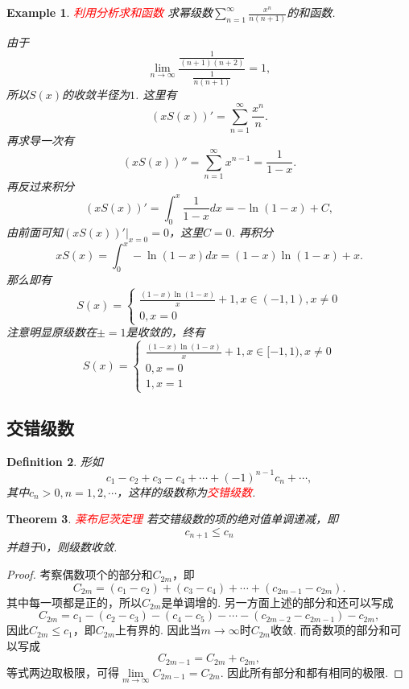 \documentclass{article}
\newtheorem{theorem}{Theorem}[section]
\newtheorem{example}[theorem]{Example}
\newtheorem{definition}[theorem]{Definition}
\newcommand{\redt}[1]{\textcolor{red}{#1}}
\begin{document}
\begin{example}
\rm \redt{利用分析求和函数} 求幂级数$\sum\limits_{n=1}^{\infty} \frac{x^n}{n(n+1)}$的和函数. 

由于
$$
\lim\limits_{n \to \infty} \frac{\frac{1}{(n+1)(n+2)}}{\frac{1}{n(n+1)}} = 1,
$$
所以$S(x)$的收敛半径为$1$. 这里有
$$
(xS(x))' = \sum\limits_{n=1}^{\infty} \frac{x^n}{n}.
$$
再求导一次有
$$
(xS(x))'' = \sum\limits_{n=1}^{\infty} x^{n-1} = \frac{1}{1-x}. 
$$
再反过来积分
$$
(xS(x))'  = \int_0^{x} \frac{1}{1-x}dx = -\ln (1-x) + C,
$$
由前面可知$(xS(x))'|_{x=0} = 0$，这里$C  = 0$. 再积分
$$
xS(x)  = \int_0^{x} -\ln(1-x)dx = (1-x)\ln(1-x)+x.
$$
那么即有
$$
S(x) = \left\{\begin{array}{ll}
\frac{(1-x)\ln (1-x)}{x} + 1, x \in (-1,1), x \neq 0 \\
0, x = 0
\end{array} \right.
$$
注意明显原级数在$\pm = 1$是收敛的，终有
$$
S(x) = \left\{\begin{array}{ll}
\frac{(1-x)\ln (1-x)}{x} + 1, x \in [-1,1), x \neq 0 \\
0, x = 0 \\
1, x = 1 
\end{array} \right.
$$
\end{example}

\subsection{交错级数}

\begin{definition}
\rm 形如
$$
c_1 - c_2 + c_3 - c_4 + \cdots + (-1)^{n-1}c_n + \cdots,
$$
其中$c_n > 0,n=1,2,\cdots$，这样的级数称为\redt{交错级数}.
\end{definition}

\begin{theorem}
\rm \redt{莱布尼茨定理} 若交错级数的项的绝对值单调递减，即
$$
c_{n+1} \leq c_n
$$
并趋于$0$，则级数收敛.
\end{theorem}

\begin{proof}
考察偶数项个的部分和$C_{2m}$，即
$$
C_{2m} = (c_1-c_2) + (c_3 - c_4) + \cdots + (c_{2m-1}-c_{2m}).
$$
其中每一项都是正的，所以$C_{2m}$是单调增的. 另一方面上述的部分和还可以写成
$$
C_{2m} = c_1 - (c_2-c_3) - (c_4-c_5) - \cdots - (c_{2m-2}-c_{2m-1}) - c_{2m},
$$
因此$C_{2m} \leq c_1$，即$C_{2m}$上有界的. 因此当$m \to \infty$时$C_{2m}$收敛. 而奇数项的部分和可以写成
$$
C_{2m-1} = C_{2m} + c_{2m}, 
$$
等式两边取极限，可得$\lim\limits_{m \to \infty} C_{2m-1}=C_{2m}$. 因此所有部分和都有相同的极限. 
\end{proof}
\end{document}
